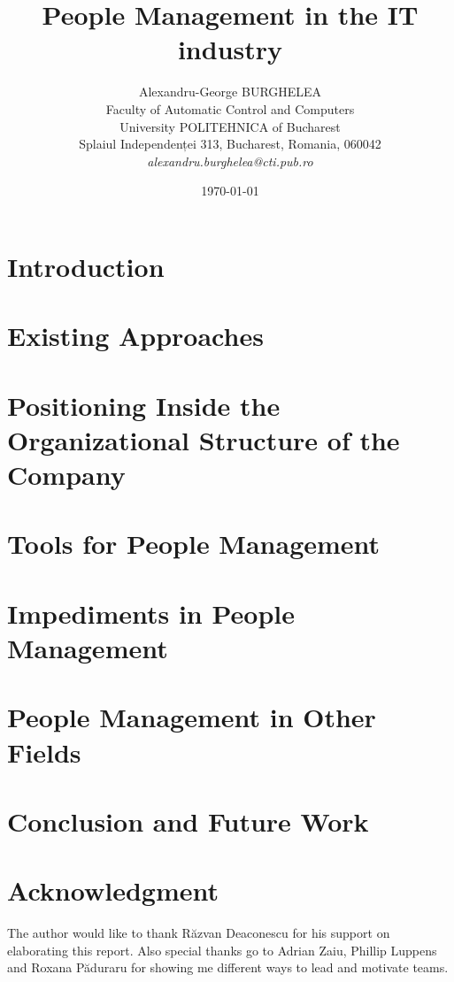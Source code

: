 \documentclass[12pt]{article}
\title{People Management in the IT industry}
\author{Alexandru-George BURGHELEA\\
Faculty of Automatic Control and Computers\\
University POLITEHNICA of Bucharest\\
Splaiul Independenței 313, Bucharest, Romania, 060042 \\
\emph{alexandru.burghelea@cti.pub.ro}}
\date{\today}
\begin{document}
\maketitle

\begin{abstract}

\end{abstract}

\section{Introduction}
\label{sec:introduction}


\section{Existing Approaches}
\label{sec:existingapproaches}


\section{Positioning Inside the Organizational Structure of the Company}
\label{sec:positioning}


\section{Tools for People Management}
\label{sec:tools}


\section{Impediments in People Management}
\label{sec:impediments}


\section{People Management in Other Fields}
\label{sec:otherfields}


\section{Conclusion and Future Work}
\label{sec:conclusion}


\section*{Acknowledgment}
\label{sec:acknowledgment}
The author would like to thank R\u{a}zvan Deaconescu for his support on elaborating this report. Also special thanks go to Adrian Zaiu, Phillip Luppens and Roxana P\u{a}duraru for showing me different ways to lead and motivate teams.



\end{document}
